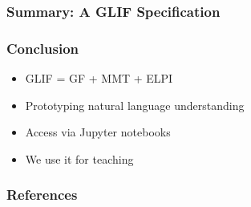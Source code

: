 \documentclass[aspectratio=169]{beamer}
\begin{document}


\begin{frame}
    \frametitle{Summary: A GLIF Specification}
    
\end{frame}


\begin{frame}
    \frametitle{Conclusion}
    \vspace{1em}
    \begin{itemize}
        \item GLIF = GF + MMT + ELPI
        \item Prototyping natural language understanding
        \item Access via Jupyter notebooks
        \item We use it for teaching
    \end{itemize}

    \vspace{2em}
    \centering
    \par
\end{frame}

\appendix



\begin{frame}[allowframebreaks,t]
    \frametitle{References}
    \printbibliography
\end{frame}
\end{document}
